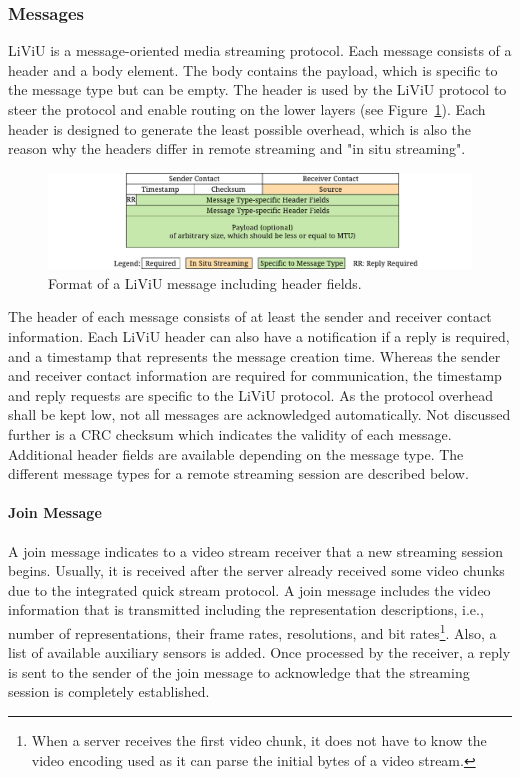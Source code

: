 \subsubsection{Messages}
\ac{LiViU} is a message-oriented media streaming protocol.
Each message consists of a header and a body element.
The body contains the payload, which is specific to the message type but can be empty.
The header is used by the \ac{LiViU} protocol to steer the protocol and enable routing on the lower layers (see Figure~\ref{fig:522_messageformat}).
Each header is designed to generate the least possible overhead, which is also the reason why the headers differ in remote streaming and "in situ streaming".

\begin{figure}
\centering
\includegraphics[width=\linewidth]{gfx/500_MobileUpload/Message_Format}
\caption{Format of a LiViU message including header fields.}
\label{fig:522_messageformat}
\end{figure}

The header of each message consists of at least the sender and receiver contact information. 
Each \ac{LiViU} header can also have a notification if a reply is required, and a timestamp that represents the message creation time. 
Whereas the sender and receiver contact information are required for communication, the timestamp and reply requests are specific to the \ac{LiViU} protocol. 
As the protocol overhead shall be kept low, not all messages are acknowledged automatically. 
Not discussed further is a \ac{CRC} checksum which indicates the validity of each message.
Additional header fields are available depending on the message type.
The different message types for a remote streaming session are described below.
\paragraph{Join Message}
A join message indicates to a video stream receiver that a new streaming session begins. 
Usually, it is received after the server already received some video chunks due to the integrated quick stream protocol.
A join message includes the video information that is transmitted including the representation descriptions, i.e., number of representations, their frame rates, resolutions, and bit rates\footnote{When a server receives the first video chunk, it does not have to know the video encoding used as it can parse the initial bytes of a video stream.}.
Also, a list of available auxiliary sensors is added.
Once processed by the receiver, a reply is sent to the sender of the join message to acknowledge that the streaming session is completely established. 
